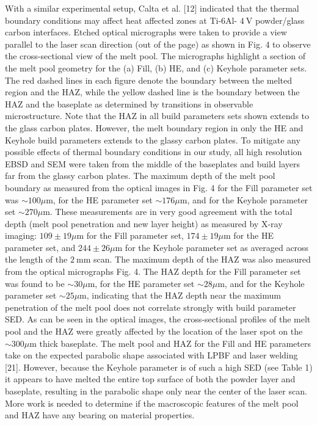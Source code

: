 \documentclass[10pt]{article}
\begin{document}
With a similar experimental setup, Calta et al. [12] indicated that the thermal boundary conditions may affect heat affected zones at Ti-6Al- $4 \mathrm{~V}$ powder/glass carbon interfaces. Etched optical micrographs were taken to provide a view parallel to the laser scan direction (out of the page) as shown in Fig. 4 to observe the cross-sectional view of the melt pool. The micrographs highlight a section of the melt pool geometry for the (a) Fill, (b) HE, and (c) Keyhole parameter sets. The red dashed lines in each figure denote the boundary between the melted region and the HAZ, while the yellow dashed line is the boundary between the HAZ and the baseplate as determined by transitions in observable microstructure. Note that the HAZ in all build parameters sets shown extends to the glass carbon plates. However, the melt boundary region in only the HE and Keyhole build parameters extends to the glassy carbon plates. To mitigate any possible effects of thermal boundary conditions in our study, all high resolution EBSD and SEM were taken from the middle of the baseplates and build layers far from the glassy carbon plates. The maximum depth of the melt pool boundary as measured from the optical images in Fig. 4 for the Fill parameter set was $\sim 100 \mu \mathrm{m}$, for the HE parameter set $\sim 176 \mu \mathrm{m}$, and for the Keyhole parameter set $\sim 270 \mu \mathrm{m}$. These measurements are in very good agreement with the total depth (melt pool penetration and new layer height) as measured by X-ray imaging: $109 \pm 19 \mu \mathrm{m}$ for the Fill parameter set, $174 \pm 19 \mu \mathrm{m}$ for the HE parameter set, and $244 \pm 26 \mu \mathrm{m}$ for the Keyhole parameter set as averaged across the length of the $2 \mathrm{~mm}$ scan. The maximum depth of the HAZ was also measured from the optical micrographs Fig. 4. The HAZ depth for the Fill parameter set was found to be $\sim 30 \mu \mathrm{m}$, for the HE parameter set $\sim 28 \mu \mathrm{m}$, and for the Keyhole parameter set $\sim 25 \mu \mathrm{m}$, indicating that the HAZ depth near the maximum penetration of the melt pool does not correlate strongly with build parameter SED. As can be seen in the optical images, the cross-sectional profiles of the melt pool and the HAZ were greatly affected by the location of the laser spot on the $\sim 300 \mu \mathrm{m}$ thick baseplate. The melt pool and HAZ for the Fill and HE parameters take on the expected parabolic shape associated with LPBF and laser welding [21]. However, because the Keyhole parameter is of such a high SED (see Table 1) it appears to have melted the entire top surface of both the powder layer and baseplate, resulting in the parabolic shape only near the center of the laser scan. More work is needed to determine if the macroscopic features of the melt pool and HAZ have any bearing on material properties.
\end{document}
